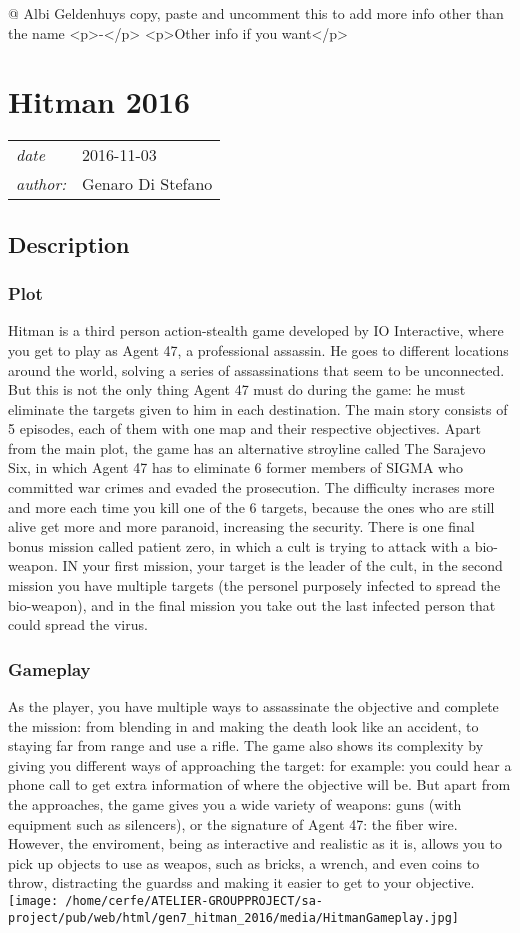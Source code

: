 \documentclass[a4paper,10pt]{book}
\newcommand{\pageHeader}[4]{
    \section{#1}
    \vspace{-0.3cm}
    \begin{table}[h!]
     \begin{tabular}{ll}
        \hline
        \textit{date} & #2 \\
        \textit{author: } & #3\\
        \hline
     \end{tabular}
    \end{table}
    \vspace{-0.3cm}
}
\begin{document}
 
 @ Albi Geldenhuys 
  copy, paste and uncomment this to add more info other than the name
            <p>-</p>
            <p>Other info if you want</p>
           
 
 \newpage\pageHeader{Hitman 2016}{2016-11-03}{Genaro Di Stefano}{A realistic action-stealth video game}
 \subsection{Description }
 \subsubsection{Plot }
 
          Hitman is a third person action-stealth game developed by IO Interactive, where you get to play as Agent 47, a professional assassin. He goes to different locations around the world, solving a series of assassinations that seem to be unconnected. But this is not the only thing Agent 47 must do during the game: he must eliminate the targets given to him in each destination. The main story consists of 5 episodes, each of them with one map and their respective objectives.   Apart from the main plot, the game has an alternative stroyline called The Sarajevo Six, in which Agent 47 has to eliminate 6 former members of SIGMA who committed war crimes and evaded the prosecution. The difficulty incrases more and more each time you kill one of the 6 targets, because the ones who are still alive get more and more paranoid, increasing the security. There is one final bonus mission called patient zero, in which a cult is trying to attack with a bio-weapon. IN your first mission, your target is the leader of the cult, in the second mission you have multiple targets (the personel purposely infected to spread the bio-weapon), and in the final mission you take out the last infected person that could spread the virus.
           
 \subsubsection{Gameplay }
 
        As the player, you have multiple ways to assassinate the objective and complete the mission: from blending in and making the death look like an accident, to staying far from range and use a rifle. The game also shows its complexity by giving you different ways of approaching the target: for example: you could hear a phone call to get extra information of where the objective will be. But apart from the approaches, the game gives you a wide variety of weapons: guns (with equipment such as silencers), or the signature of Agent 47: the fiber wire. However, the enviroment, being as interactive and realistic as it is, allows you to pick up objects to use as weapos, such as bricks, a wrench, and even coins to throw, distracting the guardss and making it easier to get to your objective.
         \texttt{[image: /home/cerfe/ATELIER-GROUPPROJECT/sa-project/pub/web/html/gen7\_hitman\_2016/media/HitmanGameplay.jpg]}
   
\end{document}
